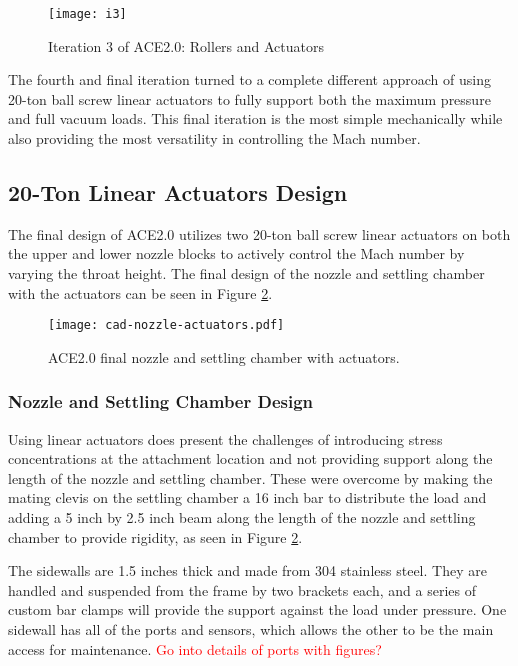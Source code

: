 \begin{figure}[ht!]
    \centering
    \texttt{[image: i3]}
    \caption{Iteration 3 of ACE2.0: Rollers and Actuators}
    \label{fig:i3}
\end{figure}

The fourth and final iteration turned to a complete different approach of using 20-ton ball screw linear actuators to fully support both the maximum pressure and full vacuum loads. This final iteration is the most simple mechanically while also providing the most versatility in controlling the Mach number.

\subsection{20-Ton Linear Actuators Design}

The final design of ACE2.0 utilizes two 20-ton ball screw linear actuators on both the upper and lower nozzle blocks to actively control the Mach number by varying the throat height. The final design of the nozzle and settling chamber with the actuators can be seen in Figure \ref{fig:cad-nozzle-actuators}. 

\begin{figure}[ht!]
    \centering
    \texttt{[image: cad-nozzle-actuators.pdf]}
    \caption{ACE2.0 final nozzle and settling chamber with actuators.}
    \label{fig:cad-nozzle-actuators}
\end{figure}

\subsubsection{Nozzle and Settling Chamber Design}

Using linear actuators does present the challenges of introducing stress concentrations at the attachment location and not providing support along the length of the nozzle and settling chamber. These were overcome by making the mating clevis on the settling chamber a 16 inch bar to distribute the load and adding a 5 inch by 2.5 inch beam along the length of the nozzle and settling chamber to provide rigidity, as seen in Figure \ref{fig:cad-nozzle-actuators}.

The sidewalls are 1.5 inches thick and made from 304 stainless steel. They are handled and suspended from the frame by two brackets each, and a series of custom bar clamps will provide the support against the load under pressure. One sidewall has all of the ports and sensors, which allows the other to be the main access for maintenance. \textcolor{red}{Go into details of ports with figures?}

